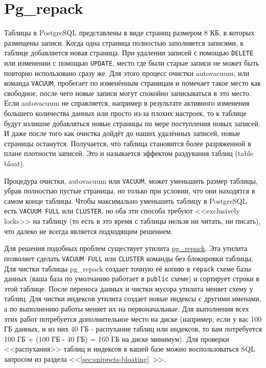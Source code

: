 \section{Pg\_repack}

Таблицы в PostgreSQL представлены в виде страниц размером 8 КБ, в которых размещены записи. Когда одна страница полностью заполняется записями, к таблице добавляется новая страница. При удалении записей с помощью \lstinline!DELETE! или изменении с помощью \lstinline!UPDATE!, место где были старые записи не может быть повторно использовано сразу же. Для этого процесс очистки autovacuum, или команда \lstinline!VACUUM!, пробегает по изменённым страницам и помечает такое место как свободное, после чего новые записи могут спокойно записываться в это место. Если autovacuum не справляется, например в результате активного изменения большего количества данных или просто из-за плохих настроек, то к таблице будут излишне добавляться новые страницы по мере поступления новых записей. И даже после того как очистка дойдёт до наших удалённых записей, новые страницы останутся. Получается, что таблица становится более разряженной в плане плотности записей. Это и называется эффектом раздувания таблиц (table bloat).

Процедура очистки, autovacuum или \lstinline!VACUUM!, может уменьшить размер таблицы, убрав полностью пустые страницы, но только при условии, что они находятся в самом конце таблицы. Чтобы максимально уменьшить таблицу в PostgreSQL есть \lstinline!VACUUM FULL! или \lstinline!CLUSTER!, но оба эти способа требуют <<exclusively locks>> на таблицу (то есть в это время с таблицы нельзя ни читать, ни писать), что далеко не всегда является подходящим решением.

Для решения подобных проблем существует утилита \href{http://reorg.github.io/pg\_repack/}{pg\_repack}. Эта утилита позволяет сделать \lstinline!VACUUM FULL! или \lstinline!CLUSTER! команды без блокировки таблицы. Для чистки таблицы pg\_repack создает точную её копию в \lstinline!repack! схеме базы данных (ваша база по умолчанию работает в \lstinline!public! схеме) и сортирует строки в этой таблице. После переноса данных и чистки мусора утилита меняет схему у таблиц. Для чистки индексов утилита создает новые индексы с другими именами, а по выполнению работы меняет их на первоначальные. Для выполнения всех этих работ потребуется дополнительное место на диске (например, если у вас 100 ГБ данных, и из них 40 ГБ - распухание таблиц или индексов, то вам потребуется 100 ГБ + (100 ГБ - 40 ГБ) = 160 ГБ на диске минимум). Для проверки <<распухания>> таблиц и индексов в вашей базе можно воспользоваться SQL запросом из раздела <<\ref{sec:snippets-bloating}~>>.

